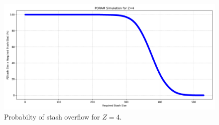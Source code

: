 \begin{figure}[H]
    \centering
    \includegraphics[width=\textwidth]{02-ex1/plot_z_4.png}
    \caption{Probabilty of stash overflow for $Z=4$.}
    \label{fig:stash-overflow-for-Z=4}
\end{figure}